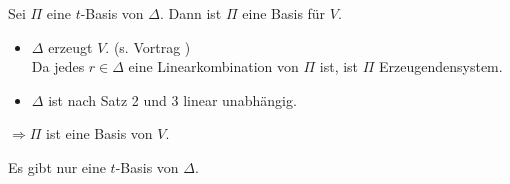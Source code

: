 \documentclass[18pt,handout]{beamer}
\begin{document}
\begin{frame}
    \begin{satz} %
        Sei \( \Pi \) eine \(t\)-Basis von \( \Delta \). Dann ist 
        \( \Pi \) eine Basis für \( V \).
    \end{satz}
    \pause
    \begin{bew}
        \begin{itemize}
            \item \( \Delta \) erzeugt \( V \). (s. Vortrag )\\
            Da jedes \( r \in \Delta \) eine Linearkombination von \( \Pi \) ist, 
            ist \( \Pi \) Erzeugendensystem. \pause
            \item<2-> \( \Delta \) ist nach Satz 2 und 3 linear unabhängig.
        \end{itemize} \pause
        \( \Rightarrow \Pi \) ist eine Basis von \(V\).
    \end{bew}
\end{frame}

\begin{frame}
    \begin{satz} %
        Es gibt nur eine \( t \)-Basis von \( \Delta \).
    \end{satz}
\end{frame}
\end{document}
